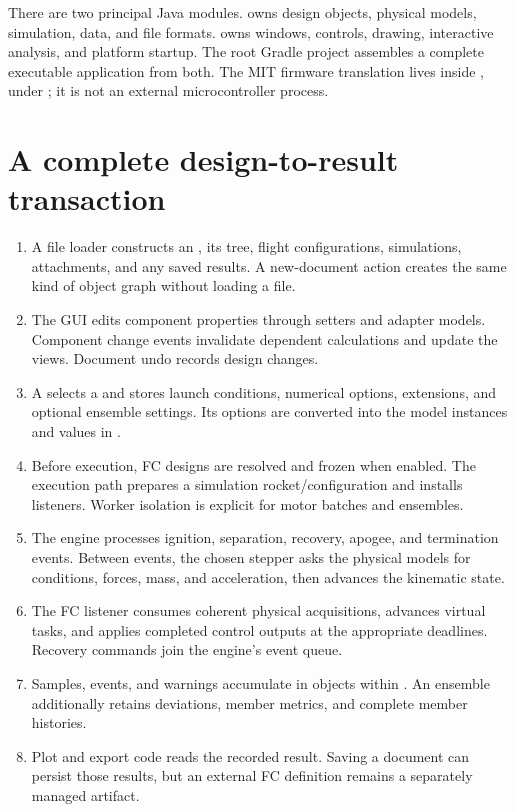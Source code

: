 There are two principal Java modules.  owns design objects, physical models, simulation, data, and file formats.  owns windows, controls, drawing, interactive analysis, and platform startup. The root Gradle project assembles a complete executable application from both. The MIT firmware translation lives inside , under ; it is not an external microcontroller process.

\section{A complete design-to-result transaction}
\begin{enumerate}
\item A file loader constructs an , its  tree, flight configurations, simulations, attachments, and any saved results. A new-document action creates the same kind of object graph without loading a file.
\item The GUI edits component properties through setters and adapter models. Component change events invalidate dependent calculations and update the views. Document undo records design changes.
\item A  selects a  and stores launch conditions, numerical options, extensions, and optional ensemble settings. Its options are converted into the model instances and values in .
\item Before execution, FC designs are resolved and frozen when enabled. The execution path prepares a simulation rocket/configuration and installs listeners. Worker isolation is explicit for motor batches and ensembles.
\item The engine processes ignition, separation, recovery, apogee, and termination events. Between events, the chosen stepper asks the physical models for conditions, forces, mass, and acceleration, then advances the kinematic state.
\item The FC listener consumes coherent physical acquisitions, advances virtual tasks, and applies completed control outputs at the appropriate deadlines. Recovery commands join the engine's event queue.
\item Samples, events, and warnings accumulate in  objects within . An ensemble additionally retains deviations, member metrics, and complete member histories.
\item Plot and export code reads the recorded result. Saving a document can persist those results, but an external FC definition remains a separately managed artifact.
\end{enumerate}

